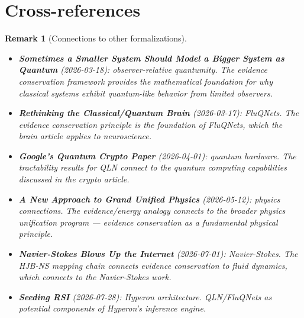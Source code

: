 \documentclass[11pt,a4paper]{article}
\newtheorem{remark}[definition]{Remark}
\begin{document}

\section{Cross-references}

\begin{remark}[Connections to other formalizations]
\begin{itemize}
\item \textbf{Sometimes a Smaller System Should Model a Bigger System
  as Quantum} (2026-03-18): observer-relative quantumity. The evidence
  conservation framework provides the mathematical foundation for why
  classical systems exhibit quantum-like behavior from limited observers.
\item \textbf{Rethinking the Classical/Quantum Brain} (2026-03-17):
  FluQNets. The evidence conservation principle is the foundation of
  FluQNets, which the brain article applies to neuroscience.
\item \textbf{Google's Quantum Crypto Paper} (2026-04-01): quantum
  hardware. The tractability results for QLN connect to the quantum
  computing capabilities discussed in the crypto article.
\item \textbf{A New Approach to Grand Unified Physics} (2026-05-12):
  physics connections. The evidence/energy analogy connects to the
  broader physics unification program --- evidence conservation as a
  fundamental physical principle.
\item \textbf{Navier-Stokes Blows Up the Internet} (2026-07-01):
  Navier-Stokes. The HJB-NS mapping chain connects evidence conservation
  to fluid dynamics, which connects to the Navier-Stokes work.
\item \textbf{Seeding RSI} (2026-07-28): Hyperon architecture. QLN/FluQNets
  as potential components of Hyperon's inference engine.
\end{itemize}
\end{remark}
\end{document}
